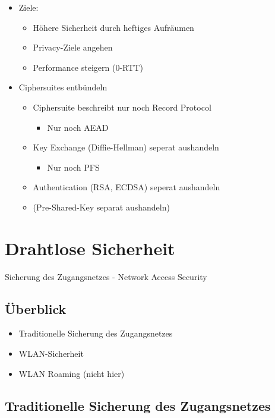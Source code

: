 \documentclass[openany]{book}
\begin{document}
\begin{itemize}
    \item Ziele:
    \begin{itemize}
        \item Höhere Sicherheit durch heftiges Aufräumen
        \item Privacy-Ziele angehen
        \item Performance steigern (0-RTT)
    \end{itemize}
    \item Ciphersuites entbündeln
    \begin{itemize}
        \item Ciphersuite beschreibt nur noch Record Protocol
        \begin{itemize}
            \item Nur noch AEAD
        \end{itemize}
        \item Key Exchange (Diffie-Hellman) seperat aushandeln
        \begin{itemize}
            \item Nur noch PFS
        \end{itemize}
        \item Authentication (RSA, ECDSA) seperat aushandeln
        \item (Pre-Shared-Key separat aushandeln)
    \end{itemize}
\end{itemize}

\chapter{Drahtlose Sicherheit}

Sicherung des Zugangsnetzes - Network Access Security

\section{Überblick}

\begin{itemize}
    \item Traditionelle Sicherung des Zugangsnetzes
    \item WLAN-Sicherheit
    \item WLAN Roaming (nicht hier) 
\end{itemize}

\section{Traditionelle Sicherung des Zugangsnetzes}
\end{document}
